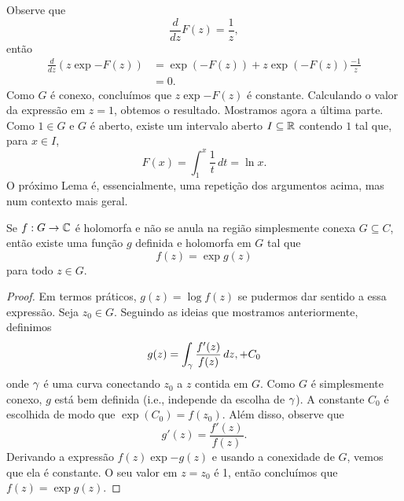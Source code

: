     Observe que 
    \begin{equation*}
        \frac{d}{dz}F(z) = \frac{1}{z},
    \end{equation*}    
    então 
    \begin{align*}
        \frac{d}{dz}(z\exp{-F(z)}) &= \exp{(-F(z))} + z\exp{(-F(z))}\frac{-1}{z} \\
        & = 0.
    \end{align*}
    Como $G$ é conexo, concluímos que $z\exp{-F(z)}$ é constante. Calculando o 
    valor da expressão em $z = 1$, obtemos o resultado. Mostramos agora a última
    parte. Como $1 \in G$ e $G$ é aberto, existe um intervalo aberto 
    $I \subseteq \mathbb{R}$ contendo $1$ tal que, para $x \in I$,
    \begin{equation*}
        F(x) = \int_{1}^{x} \frac{1}{t} \, dt = \ln{x}.
    \end{equation*}    
    O próximo Lema é, essencialmente, uma repetição dos argumentos acima, mas 
    num contexto mais geral.
    \begin{lema}%
    \label{lema-ramo-log}
        Se $f : G \to \mathbb{C}$ é holomorfa e não se anula na região simplesmente conexa 
        $G \subseteq C$, então existe uma função $g$ definida e holomorfa em $G$ 
        tal que 
        \begin{equation*}
            f(z) = \exp{g(z)}
        \end{equation*}
        para todo $z \in G$.
    \end{lema}
    \begin{proof}
        Em termos práticos, $g(z) = \log f(z)$ se pudermos dar sentido a essa
        expressão. Seja $z_0 \in G$. Seguindo as ideias que mostramos anteriormente,
        definimos
        \begin{equation*}
            g(z) = \int_{\gamma} \frac{f'(z)}{f(z)} \, dz, + C_0
        \end{equation*}
        onde $\gamma$ é uma curva conectando $z_0$ a $z$ contida em $G$. Como $G$ é
        simplesmente conexo, $g$ está bem definida (i.e., independe da escolha de
        $\gamma$). A constante $C_0$ é escolhida de modo que $\exp(C_0) = f(z_0)$. 
        Além disso, observe que 
        \begin{equation*}
            g'(z) = \frac{f'(z)}{f(z)}.
        \end{equation*}
        Derivando a expressão $f(z)\exp{-g(z)}$ e usando a conexidade de $G$, vemos
        que ela é constante. O seu valor em $z = z_0$ é 1, então concluímos que 
        $f(z) = \exp{g(z)}$.
    \end{proof}
